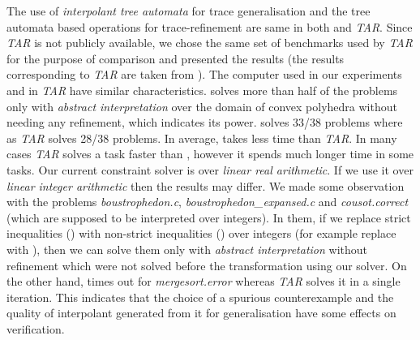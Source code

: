 The use of \emph{interpolant tree automata} for trace generalisation and the  tree automata based operations for trace-refinement are same  in both  and  \emph{TAR}. Since \emph{TAR} is not publicly available, we chose the same set of benchmarks  used by \emph{TAR} for the purpose of comparison and presented the results (the results corresponding to \emph{TAR} are taken from \cite{WangJ2015}). The computer used in our experiments and in \emph{TAR} \cite{WangJ2015} have similar characteristics.  solves more than half of the problems  only with \emph{abstract interpretation} over the domain of convex polyhedra without needing any refinement, which indicates its power.  solves 33/38 problems where as \emph{TAR} solves 28/38 problems. In average,  takes less time than \emph{TAR}. In many cases \emph{TAR} solves a task faster than ,   however  it spends much longer time in some tasks.  
Our current constraint solver is over   \emph{linear real arithmetic}. If we use it over \emph{linear integer arithmetic} then the results may differ. 
We made some observation with   the problems  \emph{boustrophedon.c},  \emph{boustrophedon\_expansed.c} and \emph{cousot.correct} (which are supposed to be interpreted over integers). In them, if we replace strict inequalities ()  with non-strict inequalities () over integers  (for example replace  with ), then we can solve them only with \emph{abstract interpretation} without refinement which were not solved before the transformation using our solver.  On the other hand,  times out for \emph{ mergesort.error } whereas \emph{TAR} solves it in a single iteration. This indicates that the choice of a spurious counterexample and the quality of interpolant generated from it for generalisation have some effects on verification.



